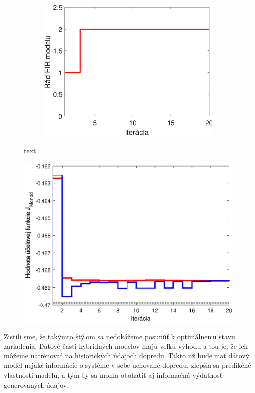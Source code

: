 \begin{figure}
\begin{subfigure}[b]{0.49\textwidth}
		\caption{}
		\label{fig:hybrid_sub_ss}
	\end{subfigure}
	\bigskip
	\begin{subfigure}[b]{0.49\textwidth}
		\centering
		\includegraphics[width=\linewidth]{images/hybrid_sub_order}
		\caption{}
		\label{fig:hybrid_sub_order}
	\end{subfigure}
	\caption{text}
	\label{fig:hybrid_sub_opt_results}	
\end{figure}

\begin{figure}
	\centering
	\includegraphics[width=0.7\linewidth]{images/hybrid_sub_and_bio_compar}
	\caption{}
	\label{fig:hybrid_sub_and_bio_compar}
\end{figure}

Zistili sme, že takýmto štýlom sa nedokážeme posunúť k optimálnemu stavu zariadenia. Dátové časti hybridných modelov majú veľkú výhodu a tou je, že ich môžeme natrénovať na historických údajoch dopredu. Takto už bude mať dátový model nejaké informácie o systéme v sebe uchované dopredu, zlepšia sa predikčné vlastnosti modelu, a tým by sa mohla obohatiť aj informačná výdatnosť generovaných údajov.

